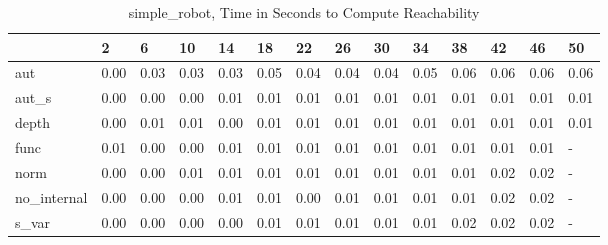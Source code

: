 \begin{table}
\caption{simple_robot, Time in Seconds to Compute Reachability}
\label{simple_robot_states_time}
\begin{tabular}{llllllllllllll}
\toprule
 & 2 & 6 & 10 & 14 & 18 & 22 & 26 & 30 & 34 & 38 & 42 & 46 & 50 \\
\midrule
aut & 0.00 & 0.03 & 0.03 & 0.03 & 0.05 & 0.04 & 0.04 & 0.04 & 0.05 & 0.06 & 0.06 & 0.06 & 0.06 \\
aut_s & 0.00 & 0.00 & 0.00 & 0.01 & 0.01 & 0.01 & 0.01 & 0.01 & 0.01 & 0.01 & 0.01 & 0.01 & 0.01 \\
depth & 0.00 & 0.01 & 0.01 & 0.00 & 0.01 & 0.01 & 0.01 & 0.01 & 0.01 & 0.01 & 0.01 & 0.01 & 0.01 \\
func & 0.01 & 0.00 & 0.00 & 0.01 & 0.01 & 0.01 & 0.01 & 0.01 & 0.01 & 0.01 & 0.01 & 0.01 & - \\
norm & 0.00 & 0.00 & 0.01 & 0.01 & 0.01 & 0.01 & 0.01 & 0.01 & 0.01 & 0.01 & 0.02 & 0.02 & - \\
no_internal & 0.00 & 0.00 & 0.00 & 0.01 & 0.01 & 0.00 & 0.01 & 0.01 & 0.01 & 0.01 & 0.02 & 0.02 & - \\
s_var & 0.00 & 0.00 & 0.00 & 0.00 & 0.01 & 0.01 & 0.01 & 0.01 & 0.01 & 0.02 & 0.02 & 0.02 & - \\
\bottomrule
\end{tabular}
\end{table}
